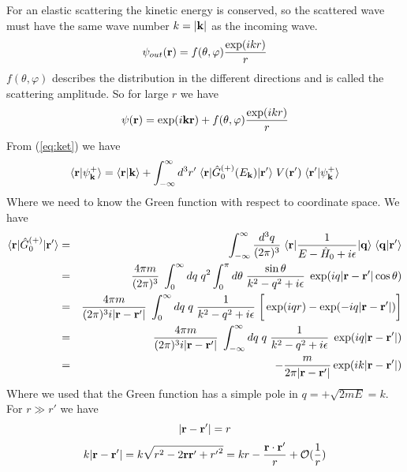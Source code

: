 For an elastic scattering the kinetic energy is conserved, so the scattered wave must have the same 
wave number $k=|{\bf k}|$ as the incoming wave.
\begin{equation}
\psi_{out} ({\bf r})=f(\theta ,\varphi)\frac{\exp (i{ kr})}{r}
\end{equation}
%
$f(\theta ,\varphi)$ describes the distribution in the different directions and is called
the scattering amplitude. 
So for large $r$ we have
%
\begin{equation}\label{eq:spredamp} 
\psi ({\bf r})=\exp (i{\bf kr}) + f(\theta ,\varphi)\frac{\exp (i{ kr})}{r} 
\end{equation}
%
From (\ref{eq:ket}) we have
%
\begin{equation}\label{eq:ledd}
\braket{{\bf r}}{\psi_{\bf k}^{+}}=\braket{{\bf r}}{{\bf k}}+
\int^{\infty}_{-\infty}d^3 {{ r}'}\;\braketm{{\bf r}}{\op{G}^{(+)}_0(E_{\bf k})}{{\bf r}'}\;
{V}({{\bf r}'})\;\braket{{\bf r}'}{\psi_{\bf k}^{+}} 
\end{equation}
%
Where we need to know the Green function with respect to coordinate space. We have
%
\begin{eqnarray}
\langle{\bf r}|\hat{G}^{(+)}_0|{\bf r}'\rangle 
&=&
\int^{\infty}_{-\infty}\frac{d^3 {{ q}}}{(2\pi)^3}\;
\langle{\bf r}|\frac{1}{E-\hat{H}_0+ i\epsilon} |{\bf q}\rangle\;\langle{\bf q}|{\bf r}'\rangle \nonumber\\ 
&=&
\frac{4\pi m}{(2\pi)^3}\;\int^{\infty}_{0}dq\;q^2\int^{\pi}_{0}d\theta\; 
\frac{\sin\theta}{{{ k}^2}-{{ q}^2}+ i\epsilon}\;\exp(iq|{\bf r}-{\bf r}'|\cos\theta) \nonumber\\ 
&=& 
\frac{4\pi m}{(2\pi)^3i|{\bf r}-{\bf r}'|}\;\int^{\infty}_{0}dq\;q\;
\frac{1}{{{ k}^2}-{{ q}^2}+ i\epsilon}\;\bigg[\exp(iqr)-\exp(-iq|{\bf r}-{\bf r}'|)\bigg] \nonumber\\
&=&
\frac{4\pi m}{(2\pi)^3i|{\bf r}-{\bf r}'|}\;\int^{\infty}_{-\infty}dq\;q\;
\frac{1}{{{ k}^2}-{{ q}^2}+ i\epsilon}\;\exp(iq|{\bf r}-{\bf r}'|) \nonumber\\
&=&
-\frac{m}{2\pi |{\bf r}-{\bf r}'|}\exp(ik|{\bf r}-{\bf r}'|)
\end{eqnarray}
%
Where we used that the Green function has a simple pole in $q=+\sqrt{2mE}=k$.  
For $r\gg r'$ we have
\begin{equation} 
|{\bf r}-{\bf r}'|= r
\end{equation}  
\begin{equation} 
k|{\bf r}-{\bf r}'|=k\sqrt{r^2-2{\bf r}{{\bf r}'}+{r'}^2}=kr-\frac{{\bf r}
\cdot{{\bf r}'}}{r}+{\cal O}(\frac{1}{r})
\end{equation}  
